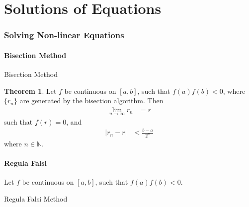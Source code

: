 \documentclass[fleqn, a4paper, 12pt, twoside, titlepage]{article}
\theoremstyle{definition}
\theoremstyle{theorem}
\newtheorem{theorem}{Theorem}
\begin{document}
\newpage
\part{Solutions of Equations}

\section{Solving Non-linear Equations}

\subsection{Bisection Method}

\begin{algorithm}[H]
	\begin{algorithmic}[1]
		\Else
		\EndIf
	\end{algorithmic}
	\caption{Bisection Method}
\end{algorithm}

\begin{theorem}
	Let $f$ be continuous on $[a,b]$, such that $f(a) f(b) < 0$, where $\{r_n\}$ are generated by the bisection algorithm.
	Then
	\begin{align*}
		\lim\limits_{n \to \infty} r_n &= r
	\end{align*}
	such that $f(r) = 0$, and
	\begin{align*}
		|r_n - r| &< \frac{b - a}{2^n}
	\end{align*}
	where $n \in \mathbb{N}$.
\end{theorem}

\subsection{Regula Falsi}

\begin{algorithm}[H]
	\begin{algorithmic}[1]
		\State Let $f$ be continuous on $[a,b]$, such that $f(a) f(b) < 0$.
		\Else
		\EndIf
	\end{algorithmic}
	\caption{Regula Falsi Method}
\end{algorithm}
\end{document}
